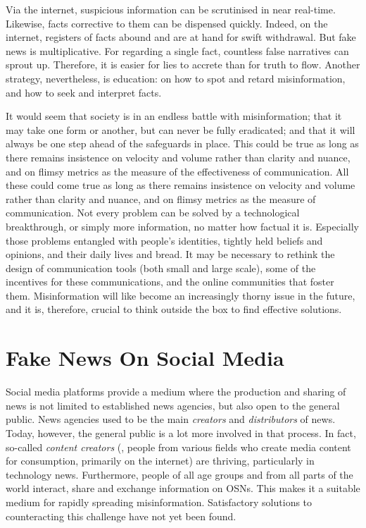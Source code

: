 Via the internet, suspicious information can be scrutinised in near real-time. Likewise, facts corrective to them can be dispensed quickly. Indeed, on the internet, registers of facts abound and are at hand for swift withdrawal. But fake news is multiplicative. For regarding a single fact, countless false narratives can sprout up. Therefore, it is easier for lies to accrete than for truth to flow. Another strategy, nevertheless, is education: on how to spot and retard misinformation, and how to seek and interpret facts.

It would seem that society is in an endless battle with misinformation; that it may take one form or another, but can never be fully eradicated; and that it will always be one step ahead of the safeguards in place. This could be true as long as there remains insistence on velocity and volume rather than clarity and nuance, and on flimsy metrics as the measure of the effectiveness of communication. All these could come true as long as there remains insistence on velocity and volume rather than clarity and nuance, and on flimsy metrics as the measure of communication. Not every problem can be solved by a technological breakthrough, or simply more information, no matter how factual it is. Especially those problems entangled with people's identities, tightly held beliefs and opinions, and their daily lives and bread. It may be necessary to rethink the design of communication tools (both small and large scale), some of the incentives for these communications, and the online communities that foster them. Misinformation will like become an increasingly thorny issue in the future, and it is, therefore, crucial to think outside the box to find effective solutions.

\section{Fake News On Social Media}
\label{ssec:1-fnosn}

\vspace*{-\baselineskip}

Social media platforms provide a medium where the production and sharing of news is not limited to established news agencies, but also open to the general public. News agencies used to be the main \emph{creators} and \emph{distributors} of news. Today, however, the general public is a lot more involved in that process. In fact, so-called \emph{content creators} (\ie, people from various fields who create media content for consumption, primarily on the internet) are thriving, particularly in technology news. Furthermore, people of all age groups and from all parts of the world interact, share and exchange information on \acp{OSN}. This makes it a suitable medium for rapidly spreading misinformation. Satisfactory solutions to counteracting this challenge have not yet been found.

